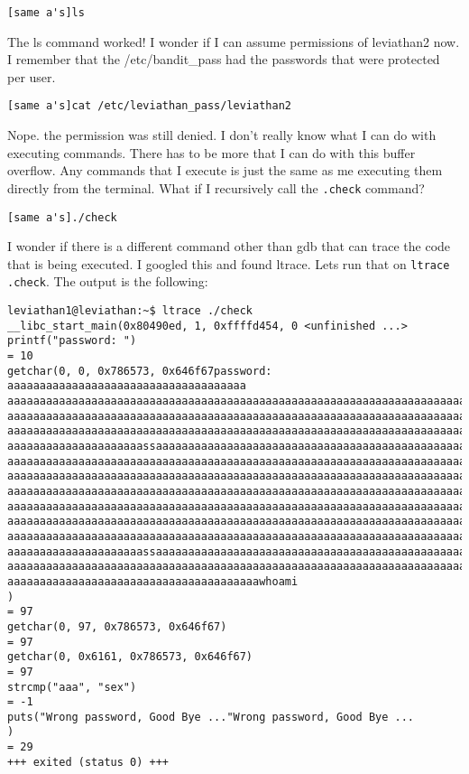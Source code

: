 \documentclass[11pt]{article}
\begin{document}
\begin{lstlisting}
[same a's]ls
\end{lstlisting}

The ls command worked! I wonder if I can assume permissions of leviathan2 now. I remember that the /etc/bandit\_pass had the passwords that were protected per user.

\begin{lstlisting}
[same a's]cat /etc/leviathan_pass/leviathan2
\end{lstlisting}

Nope. the permission was still denied. I don't really know what I can do with executing commands. There has to be more that I can do with this buffer overflow. Any commands that I execute is just the same as me executing them directly from the terminal. What if I recursively call the \verb|.check| command?

\begin{lstlisting}
[same a's]./check
\end{lstlisting}

I wonder if there is a different command other than gdb that can trace the code that is being executed. I googled this and found ltrace. Lets run that on \verb|ltrace .check|. The output is the following:

\begin{lstlisting}
leviathan1@leviathan:~$ ltrace ./check
__libc_start_main(0x80490ed, 1, 0xffffd454, 0 <unfinished ...>
printf("password: ")                                                                                     = 10
getchar(0, 0, 0x786573, 0x646f67password: aaaaaaaaaaaaaaaaaaaaaaaaaaaaaaaaaaaaa
aaaaaaaaaaaaaaaaaaaaaaaaaaaaaaaaaaaaaaaaaaaaaaaaaaaaaaaaaaaaaaaaaaaaaaaaaaaaaaa
aaaaaaaaaaaaaaaaaaaaaaaaaaaaaaaaaaaaaaaaaaaaaaaaaaaaaaaaaaaaaaaaaaaaaaaaaaaaaaa
aaaaaaaaaaaaaaaaaaaaaaaaaaaaaaaaaaaaaaaaaaaaaaaaaaaaaaaaaaaaaaaaaaaaaaaaaaaaaaa
aaaaaaaaaaaaaaaaaaaaassaaaaaaaaaaaaaaaaaaaaaaaaaaaaaaaaaaaaaaaaaaaaaaaaaaaaaaaa
aaaaaaaaaaaaaaaaaaaaaaaaaaaaaaaaaaaaaaaaaaaaaaaaaaaaaaaaaaaaaaaaaaaaaaaaaaaaaaa
aaaaaaaaaaaaaaaaaaaaaaaaaaaaaaaaaaaaaaaaaaaaaaaaaaaaaaaaaaaaaaaaaaaaaaaaaaaaaaa
aaaaaaaaaaaaaaaaaaaaaaaaaaaaaaaaaaaaaaaaaaaaaaaaaaaaaaaaaaaaaaaaaaaaaaaaaaaaaaa
aaaaaaaaaaaaaaaaaaaaaaaaaaaaaaaaaaaaaaaaaaaaaaaaaaaaaaaaaaaaaaaaaaaaaaaaaaaaaaa
aaaaaaaaaaaaaaaaaaaaaaaaaaaaaaaaaaaaaaaaaaaaaaaaaaaaaaaaaaaaaaaaaaaaaaaaaaaaaaa
aaaaaaaaaaaaaaaaaaaaaaaaaaaaaaaaaaaaaaaaaaaaaaaaaaaaaaaaaaaaaaaaaaaaaaaaaaaaaaa
aaaaaaaaaaaaaaaaaaaaassaaaaaaaaaaaaaaaaaaaaaaaaaaaaaaaaaaaaaaaaaaaaaaaaaaaaaaaa
aaaaaaaaaaaaaaaaaaaaaaaaaaaaaaaaaaaaaaaaaaaaaaaaaaaaaaaaaaaaaaaaaaaaaaaaaaaaaaa
aaaaaaaaaaaaaaaaaaaaaaaaaaaaaaaaaaaaaaawhoami
)                                                                        = 97
getchar(0, 97, 0x786573, 0x646f67)                                                                       = 97
getchar(0, 0x6161, 0x786573, 0x646f67)                                                                   = 97
strcmp("aaa", "sex")                                                                                     = -1
puts("Wrong password, Good Bye ..."Wrong password, Good Bye ...
)                                                                     = 29
+++ exited (status 0) +++
\end{lstlisting}
\end{document}

